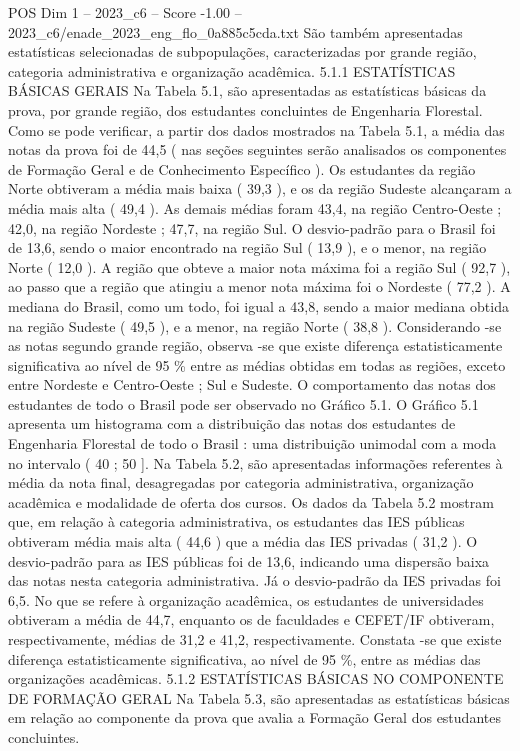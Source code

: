 \begin{textsample}{POS Dim 1 – 2023\_c6 – Score -1.00 – 2023\_c6/enade\_2023\_eng\_flo\_0a885c5cda.txt}
São também apresentadas estatísticas selecionadas de subpopulações, caracterizadas por grande região, categoria administrativa e organização acadêmica. 5.1.1 ESTATÍSTICAS BÁSICAS GERAIS Na Tabela 5.1, são apresentadas as estatísticas básicas da prova, por grande região, dos estudantes concluintes de Engenharia Florestal.
Como se pode verificar, a partir dos dados mostrados na Tabela 5.1, a média das notas da prova foi de 44,5 ( nas seções seguintes serão analisados os componentes de Formação Geral e de Conhecimento Específico ).
Os estudantes da região Norte obtiveram a média mais baixa ( 39,3 ), e os da região Sudeste alcançaram a média mais alta ( 49,4 ).
As demais médias foram 43,4, na região Centro-Oeste ; 42,0, na região Nordeste ; 47,7, na região Sul.
O desvio-padrão para o Brasil foi de 13,6, sendo o maior encontrado na região Sul ( 13,9 ), e o menor, na região Norte ( 12,0 ).
A região que obteve a maior nota máxima foi a região Sul ( 92,7 ), ao passo que a região que atingiu a menor nota máxima foi o Nordeste ( 77,2 ).
A mediana do Brasil, como um todo, foi igual a 43,8, sendo a maior mediana obtida na região Sudeste ( 49,5 ), e a menor, na região Norte ( 38,8 ).
Considerando -se as notas segundo grande região, observa -se que existe diferença estatisticamente significativa ao nível de 95 \% entre as médias obtidas em todas as regiões, exceto entre Nordeste e Centro-Oeste ; Sul e Sudeste.
O comportamento das notas dos estudantes de todo o Brasil pode ser observado no Gráfico 5.1.
O Gráfico 5.1 apresenta um histograma com a distribuição das notas dos estudantes de Engenharia Florestal de todo o Brasil : uma distribuição unimodal com a moda no intervalo ( 40 ; 50 ].
Na Tabela 5.2, são apresentadas informações referentes à média da nota final, desagregadas por categoria administrativa, organização acadêmica e modalidade de oferta dos cursos.
Os dados da Tabela 5.2 mostram que, em relação à categoria administrativa, os estudantes das IES públicas obtiveram média mais alta ( 44,6 ) que a média das IES privadas ( 31,2 ).
O desvio-padrão para as IES públicas foi de 13,6, indicando uma dispersão baixa das notas nesta categoria administrativa.
Já o desvio-padrão da IES privadas foi 6,5.
No que se refere à organização acadêmica, os estudantes de universidades obtiveram a média de 44,7, enquanto os de faculdades e CEFET/IF obtiveram, respectivamente, médias de 31,2 e 41,2, respectivamente.
Constata -se que existe diferença estatisticamente significativa, ao nível de 95 \%, entre as médias das organizações acadêmicas. 5.1.2 ESTATÍSTICAS BÁSICAS NO COMPONENTE DE FORMAÇÃO GERAL Na Tabela 5.3, são apresentadas as estatísticas básicas em relação ao componente da prova que avalia a Formação Geral dos estudantes concluintes.

\end{textsample}
